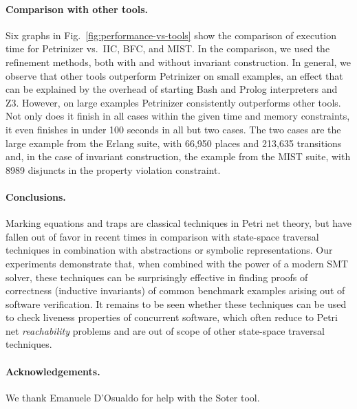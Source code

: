\paragraph{Comparison with other tools.} Six graphs in
Fig.~\ref{fig:performance-vs-tools} show the comparison of execution time for Petrinizer vs.~IIC, BFC, and MIST. 
In the comparison, we used
the refinement methods, both with and without invariant construction.
In general, we observe that other tools outperform
Petrinizer on small examples, an effect that can be explained by the
overhead of starting Bash and Prolog interpreters and Z3. 
However, on large examples Petrinizer consistently outperforms other tools.
Not only does it finish in all cases within the given time and memory
constraints, it even finishes in under 100
seconds in all but two cases. The two cases are the
large example from the Erlang suite, with 66,950 places and 213,635
transitions and, in the case of invariant construction, the example
from the MIST suite, with 8989 disjuncts in the property violation constraint.

\paragraph{Conclusions.}
%
Marking equations and traps are classical techniques in Petri net theory, but have fallen out of favor
in recent times in comparison with state-space traversal techniques in combination with abstractions
or symbolic representations.
Our experiments demonstrate that, when combined with the power of a modern SMT solver, these techniques
can be surprisingly effective in finding proofs of correctness (inductive invariants) of common benchmark examples arising
out of software verification.
It remains to be seen whether these techniques can be used to check liveness properties of concurrent
software, which often reduce to Petri net \emph{reachability} problems and are out of scope of other
state-space traversal techniques.

\paragraph{Acknowledgements.}
%
We thank Emanuele D'Osualdo for help with the Soter tool.